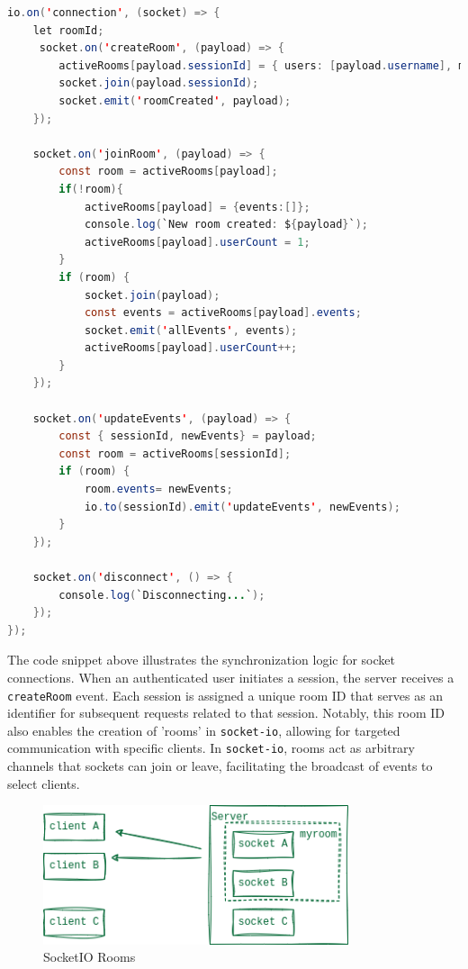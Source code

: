 \begin{lstlisting}[language=Java, caption=WebSocket Events, label=lst:java, mathescape=true]
io.on('connection', (socket) => {
    let roomId;
     socket.on('createRoom', (payload) => {
        activeRooms[payload.sessionId] = { users: [payload.username], messages: [] };
        socket.join(payload.sessionId);
        socket.emit('roomCreated', payload);
    });

    socket.on('joinRoom', (payload) => {
        const room = activeRooms[payload];
        if(!room){
            activeRooms[payload] = {events:[]};
            console.log(`New room created: ${payload}`);
            activeRooms[payload].userCount = 1;
        }
        if (room) {
            socket.join(payload);
            const events = activeRooms[payload].events;
            socket.emit('allEvents', events);
            activeRooms[payload].userCount++;
        }
    });

    socket.on('updateEvents', (payload) => {
        const { sessionId, newEvents} = payload;
        const room = activeRooms[sessionId];
        if (room) {
            room.events= newEvents;
            io.to(sessionId).emit('updateEvents', newEvents);
        }
    });

    socket.on('disconnect', () => {
        console.log(`Disconnecting...`);
    });
});
\end{lstlisting}

The code snippet above illustrates the synchronization logic for socket connections. When an authenticated user initiates a session, the server receives a \lstinline{createRoom} event. Each session is assigned a unique room ID that serves as an identifier for subsequent requests related to that session. Notably, this room ID also enables the creation of 'rooms' in \lstinline{socket-io}, allowing for targeted communication with specific clients. In \lstinline{socket-io}, rooms act as arbitrary channels that sockets can join or leave, facilitating the broadcast of events to select clients\cite{socketio}.

\begin{figure}[ht]
    \centering
    \includegraphics[width=0.8\textwidth]{diagrams/SocketIORooms.png}
    \caption{SocketIO Rooms}
    \label{fig:enter-label}
\end{figure}

